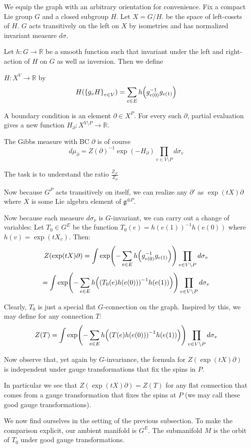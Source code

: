 \documentclass[11pt]{amsart}
\numberwithin{theorem}{subsection}
\numberwithin{lemma}{subsection}
\numberwithin{corollary}{subsection}
\numberwithin{definition}{subsection}
\numberwithin{prop}{subsection}
\newcommand{\bR}{\mathbb{R}}
\begin{document}
We equip the graph with an arbitrary orientation for convenience.
Fix a compact Lie group $G$ and a closed subgroup $H$. Let $X=G/H$. be the space of left-cosets of $H$.
$G$ acts transitively on the left on $X$ by isometries and has normalized invariant measure $d\sigma$.

Let $h:G\to \bR$ be a smooth function such that invariant under the left and right-action of $H$ on $G$ as well as inversion.
Then we define

$H:X^V\to \bR$ by 
\[H(\qty{g_v H}_{v\in V})=\sum_{e\in E}h\qty(g_{e(0)}^{-1}g_{e(1)})\]

A boundary condition is an element $\partial\in X^{P}$. 
For every such $\partial$, partial evaluation gives a new function $H_\partial:X^{V\setminus P}\to \bR$.

The Gibbs measure with BC $\partial$ is of course 
\[d\mu_\partial=Z(\partial)^{-1}\exp(- H_\partial)\prod_{v\in V\setminus P}d\sigma_v\]


The task is to understand the ratio $\frac{Z_{\partial'}}{Z_{\partial}}$

Now because $G^P$ acts transitively on itself, we can realize any $\partial'$ as $\exp(tX)\partial$
where $X$ is some Lie algebra element of $\mathfrak{g}^{\oplus P}$. 

Now because each measure $d\sigma_\nu$ is $G$-invariant, we can carry out a change of variables:
Let $T_0\in G^E$ be the function $T_0(e) = h(e(1))^{-1}h(e(0))$ where $h(v)=\exp(tX_v)$. Then:
\[Z(\exp(tX)\partial) =\int  \exp(-\sum_{e\in E} h\qty(g_{e(0)}^{-1}g_{e(1)}))\prod_{v\in V\setminus P}d\sigma_v \]
\[= \int  \exp(-\sum_{e\in E} h\qty(\qty(T_0(e)h(e(0)))^{-1}h(e(1))))\prod_{v\in V\setminus P}d\sigma_v\]

Clearly, $T_0$ is just a special flat $G$-connection on the graph. Inspired by this, we may define for any connection $T$:
\[Z(T) = \int  \exp(-\sum_{e\in E} h\qty(\qty(T(e)h(e(0)))^{-1}h(e(1))))\prod_{v\in V\setminus P}d\sigma_v\]

Now observe that, yet again by $G$-invariance, the formula for
$Z(\exp(tX)\partial)$ is independent under gauge transformations that fix the spins in $P$.

In particular we see that $Z(\exp(tX)\partial)=Z(T)$ for any flat connection that comes from a gauge transformation that fixes the spins at $P$ (we may call these good gauge transformations).

We now find ourselves in the setting of the previous subsection. To make the comparison explicit, 
our ambient manifold is $G^E$. The submanifold $M$ is the orbit of $T_0$ under good gauge transformations.
\end{document}
